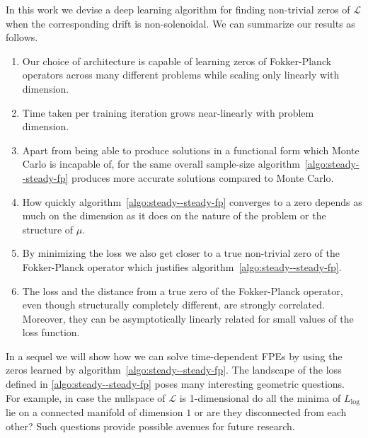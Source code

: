 In this work we devise a deep learning algorithm  for finding non-trivial zeros of $\mathcal L$ when the corresponding drift is non-solenoidal. We can summarize our results as follows. 
\begin{enumerate}
    \item Our choice of architecture is capable of learning zeros of Fokker-Planck operators across many different problems while scaling only linearly with dimension.
    \item Time taken per training iteration grows near-linearly with problem dimension.
    \item Apart from being able to produce solutions in a functional form which Monte Carlo is incapable of, for the same overall sample-size algorithm~\ref{algo:steady--steady-fp} produces more accurate solutions compared to Monte Carlo.
    \item How quickly algorithm~\ref{algo:steady--steady-fp} converges to a zero depends as much on the dimension as it does on the nature of the problem or the structure of $\mu$.
    \item By minimizing the loss we also get closer to a true non-trivial zero of the Fokker-Planck operator which justifies algorithm~\ref{algo:steady--steady-fp}.
    \item The loss and the distance from a true zero of the Fokker-Planck operator, even though structurally completely different, are strongly correlated. Moreover, they can be asymptotically linearly related for small values of the loss function.
\end{enumerate}
In a sequel we will show how we can solve time-dependent FPEs by using the zeros learned by algorithm~\ref{algo:steady--steady-fp}. The landscape of the loss defined in \eqref{algo:steady--steady-fp} poses many interesting geometric questions. For example, in case the nullspace of $\mathcal L$ is 1-dimensional do all the minima of $L_{\log}$ lie on a connected manifold of dimension $1$
or are they disconnected from each other? Such questions provide possible avenues for future research.
